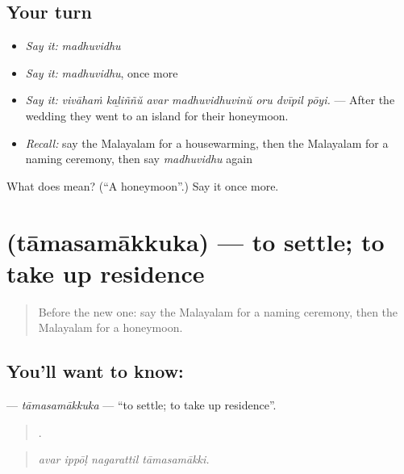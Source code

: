 \subsection*{Your turn}
\begin{itemize}
\raggedright
  \item \emph{Say it:} \emph{madhuvidhu}
  \item \emph{Say it:} \emph{madhuvidhu}, once more
  \item \emph{Say it:} \emph{vivāhaṁ kaḻiññŭ avar madhuvidhuvinŭ oru dvīpil pōyi.} — After the wedding they went to an island for their honeymoon.
  \item \emph{Recall:} say the Malayalam for a housewarming, then the Malayalam for a naming ceremony, then say \emph{madhuvidhu} again
\end{itemize}

\begin{tcolorbox}[breakable,colback=teal!4,colframe=teal!35!black,title={Before you move on}]
What does  mean? (\textquotedblleft{}A honeymoon\textquotedblright{}.) Say it once more.
\end{tcolorbox}
\section[\texorpdfstring{\ml{താമസമാക്കുക} (tāmasamākkuka)}{താമസമാക്കുക (tāmasamākkuka)}]{ (tāmasamākkuka) — to settle; to take up residence}

\label{lesson:ML-C389-tamasamakkuka}



\begin{quote}
Before the new one: say the Malayalam for a naming ceremony, then the Malayalam for a honeymoon.
\end{quote}

\subsection*{You'll want to know: }
\textbf{} — \emph{tāmasamākkuka} — \textquotedblleft{}to settle; to take up residence\textquotedblright{}.

\begin{quote}
   .
\end{quote}

\begin{quote}
\emph{avar ippōḷ nagarattil tāmasamākki.}
\end{quote}

